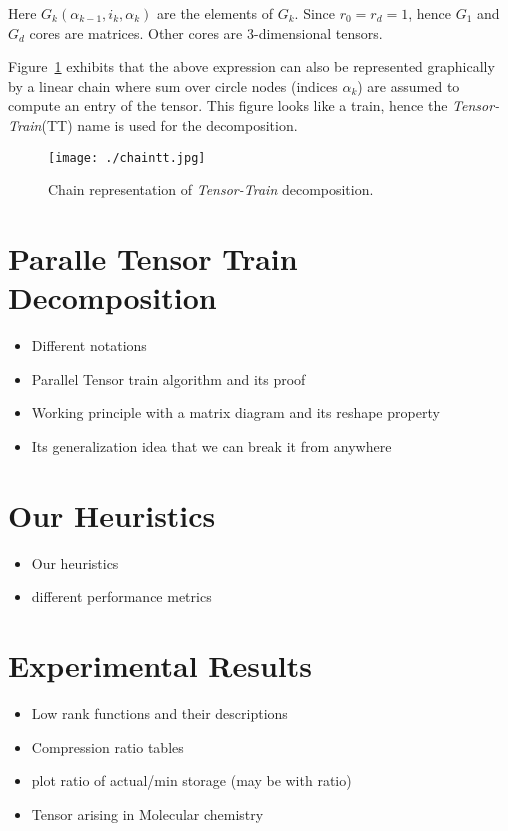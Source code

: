 \documentclass[runningheads]{llncs}
\newcommand{\ttrain}{{\it Tensor-Train}\xspace}
\begin{document}
\noindent Here $G_k(\alpha_{k-1}, i_k, \alpha_k)$ are the elements of $G_k$. Since $r_0=r_d=1$, hence $G_1$ and $G_d$ cores are matrices. Other cores are $3$-dimensional tensors.

\noindent Figure~\ref{fig:ttrainchain} exhibits that the above expression can also be represented graphically by a linear chain where sum over circle nodes (indices $\alpha_k$) are assumed to compute an entry of the tensor. This figure looks like a train, hence the \ttrain (TT) name is used for the decomposition. 

\begin{figure}[htb]
	\begin{center}
		\texttt{[image: ./chaintt.jpg]}
		\caption{Chain representation of \ttrain decomposition.\label{fig:ttrainchain}}
	\end{center}
\end{figure}

\section{Paralle Tensor Train Decomposition}
\label{sec:ptt}
\begin{itemize}
	\item Different notations
	\item Parallel Tensor train algorithm and its proof
	\item Working principle with a matrix diagram and its reshape property
	\item Its generalization idea that we can break it from anywhere
\end{itemize}
\section{Our Heuristics}
\label{sec:heuristics}
\begin{itemize}
	\item Our heuristics
	\item different performance metrics
\end{itemize}
\section{Experimental Results}
\label{sec:expResults}
\begin{itemize}
	\item Low rank functions and their descriptions
	\item Compression ratio tables
	\item plot ratio of actual/min storage (may be with ratio)
	\item Tensor arising in Molecular chemistry
\end{itemize}
\end{document}
